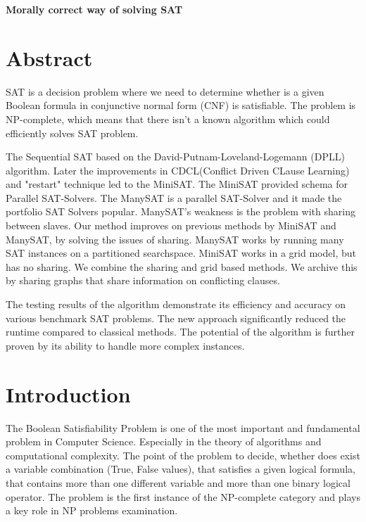 \documentclass[12pt] {article}
\begin{document}
\begin{titlepage}
    \centering
    \vspace{.7\baselineskip}
    {\huge \textbf{Morally correct way of solving SAT}}
\end{titlepage}

\newpage

\section{Abstract}
SAT is a decision problem where we need to determine whether is a given Boolean formula in conjunctive normal form (CNF) is satisfiable. The problem is NP-complete, which means that there isn’t a known algorithm which could efficiently solves SAT problem.

The Sequential SAT based on the David-Putnam-Loveland-Logemann (DPLL) algorithm. Later the improvements in CDCL(Conflict Driven CLause Learning) and "restart" technique led to the MiniSAT. The MiniSAT provided schema for Parallel SAT-Solvers. The ManySAT is a parallel SAT-Solver and it made the portfolio SAT Solvers popular. ManySAT's weakness is the problem with sharing between slaves. Our method improves on previous methods by MiniSAT and ManySAT, by solving the issues of sharing. ManySAT works by running many SAT instances on a partitioned searchspace. MiniSAT works in a grid model, but has no sharing. We combine the sharing and grid based methods. We archive this by sharing graphs that share information on conflicting clauses.

The testing results of the algorithm demonstrate its efficiency and accuracy on various benchmark SAT problems. The new approach significantly reduced the runtime compared to classical methods. The potential of the algorithm is further proven by its ability to handle more complex instances.

\section{Introduction}
The Boolean Satisfiability Problem  is one of the most important and fundamental problem in Computer Science. Especially in the theory of algorithms and computational complexity. The point of the problem to decide, whether does exist a variable combination (True, False values), that satisfies a given logical formula, that contains more than one different variable and more than one binary logical operator. The problem is the first instance of the NP-complete category and plays a key role in NP problems examination.
\end{document}
